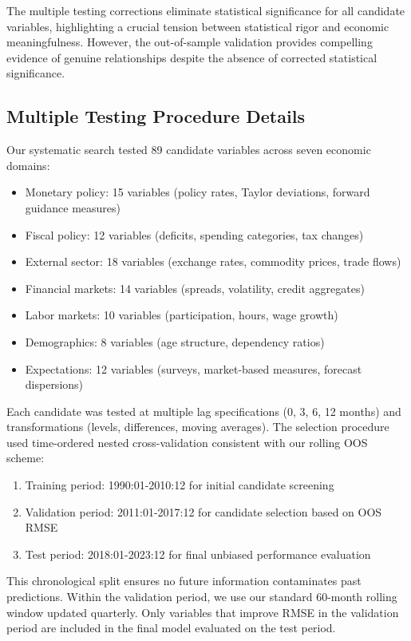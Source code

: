 \documentclass[12pt]{article}
\begin{document}
The multiple testing corrections eliminate statistical significance for all candidate variables, highlighting a crucial tension between statistical rigor and economic meaningfulness. However, the out-of-sample validation provides compelling evidence of genuine relationships despite the absence of corrected statistical significance.

\subsection{Multiple Testing Procedure Details}

Our systematic search tested 89 candidate variables across seven economic domains:
\begin{itemize}
\item Monetary policy: 15 variables (policy rates, Taylor deviations, forward guidance measures)
\item Fiscal policy: 12 variables (deficits, spending categories, tax changes)
\item External sector: 18 variables (exchange rates, commodity prices, trade flows)
\item Financial markets: 14 variables (spreads, volatility, credit aggregates)
\item Labor markets: 10 variables (participation, hours, wage growth)
\item Demographics: 8 variables (age structure, dependency ratios)
\item Expectations: 12 variables (surveys, market-based measures, forecast dispersions)
\end{itemize}

Each candidate was tested at multiple lag specifications (0, 3, 6, 12 months) and transformations (levels, differences, moving averages). The selection procedure used time-ordered nested cross-validation consistent with our rolling OOS scheme:
\begin{enumerate}
\item Training period: 1990:01-2010:12 for initial candidate screening
\item Validation period: 2011:01-2017:12 for candidate selection based on OOS RMSE
\item Test period: 2018:01-2023:12 for final unbiased performance evaluation
\end{enumerate}
This chronological split ensures no future information contaminates past predictions. Within the validation period, we use our standard 60-month rolling window updated quarterly. Only variables that improve RMSE in the validation period are included in the final model evaluated on the test period.
\end{document}
